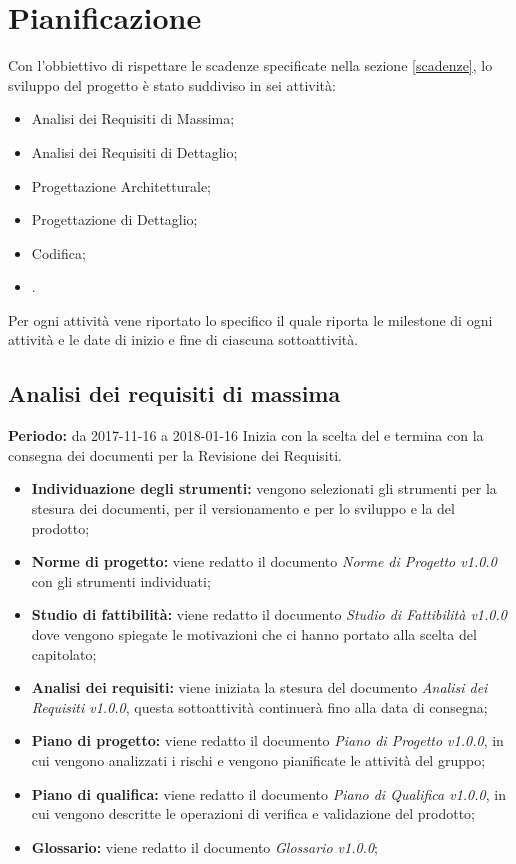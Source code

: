 \section{Pianificazione}
 
Con l'obbiettivo di rispettare le scadenze specificate nella sezione \ref{scadenze}, lo sviluppo del progetto è stato suddiviso in sei attività:
 
\begin{itemize}
 
	\item Analisi dei Requisiti di Massima;
 
	\item Analisi dei Requisiti di Dettaglio;
 
	\item Progettazione Architetturale;
 
	\item Progettazione di Dettaglio;
 
	\item Codifica;
 
	\item {}.
 
\end{itemize}
 
Per ogni attività vene riportato lo specifico  il quale riporta le milestone di ogni attività e le date di inizio e fine di ciascuna sottoattività.
 

\subsection{Analisi dei requisiti di massima}
\textbf{Periodo:} da 2017-11-16 a 2018-01-16\Spazio
Inizia con la scelta del  e termina con la consegna dei documenti per la Revisione dei Requisiti.
\begin{itemize}
	\item \textbf{Individuazione degli strumenti:} vengono selezionati gli strumenti per la stesura dei documenti, per il versionamento e per lo sviluppo e la  del prodotto;
	\item \textbf{Norme di progetto:} viene redatto il documento \emph{Norme di Progetto v1.0.0} con gli strumenti individuati;  
	\item \textbf{Studio di fattibilità:} viene redatto il documento \emph{Studio di Fattibilità v1.0.0} dove vengono spiegate le motivazioni che ci hanno portato alla scelta del capitolato;
	\item \textbf{Analisi dei requisiti:} viene iniziata la stesura del documento \emph{Analisi dei Requisiti v1.0.0}, questa sottoattività continuerà fino alla data di consegna;
	\item \textbf{Piano di progetto:} viene redatto il documento \emph{Piano di Progetto v1.0.0}, in cui vengono analizzati i rischi e vengono pianificate le attività del gruppo; 
	\item \textbf{Piano di qualifica:} viene redatto il documento \emph{Piano di Qualifica v1.0.0}, in cui vengono descritte le operazioni di verifica e validazione del prodotto;
	\item \textbf{Glossario:} viene redatto il documento \emph{Glossario v1.0.0};
\end{itemize}
